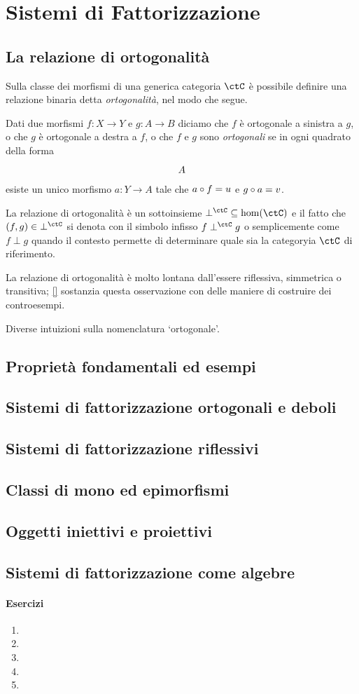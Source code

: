 \chapter{Sistemi di Fattorizzazione}
\section[Ortogonalità]{La relazione di ortogonalità}
Sulla classe dei morfismi di una generica categoria \(\ctC\) è possibile definire una relazione binaria detta \emph{ortogonalità}, nel modo che segue.
\begin{definition}
	Dati due morfismi \(f : X\to Y\) e \(g : A\to B\) diciamo che \(f\) è ortogonale a sinistra a \(g\), o che \(g\) è ortogonale a destra a \(f\), o che \(f\) e \(g\) sono \emph{ortogonali} se in ogni quadrato della forma
	\[
		\vcenter{\xymatrix{%
				A
			}}\]
	esiste un unico morfismo \(a : Y\to A\) tale che \(a\circ f=u\) e \(g\circ a=v\).
\end{definition}
La relazione di ortogonalità è un sottoinsieme \(\mathbin{\perp^\ctC} \subseteq \hom(\ctC)\) e il fatto che \((f,g)\in \mathbin{\perp^\ctC}\) si denota con il simbolo infisso \(f\perp^\ctC g\) o semplicemente come \(f\perp g\) quando il contesto permette di determinare quale sia la categoryia \(\ctC\) di riferimento.

La relazione di ortogonalità è molto lontana dall'essere riflessiva, simmetrica o transitiva; \autoref{} sostanzia questa osservazione con delle maniere di costruire dei controesempi.
\begin{remark}\label{perche_ortogonale}
	Diverse intuizioni sulla nomenclatura `ortogonale'.
\end{remark}

\section[Proprietà ed esempi]{Proprietà fondamentali ed esempi}
\section[Fattorizzazione]{Sistemi di fattorizzazione ortogonali e deboli}
\section[Riflessività]{Sistemi di fattorizzazione riflessivi}
\section[Mono ed epimorfismi]{Classi di mono ed epimorfismi}
\section[Iniettivi e proiettivi]{Oggetti iniettivi e proiettivi}
\section[Fattorizzazione e algebre]{Sistemi di fattorizzazione come algebre}
\subsubsection*{Esercizi}
\begin{enumerate}
	\item
	\item
	\item
	\item
	\item
\end{enumerate}
